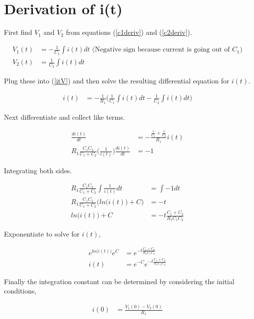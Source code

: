 \documentclass[12pt,letterpaper]{report}
\begin{document}
	\section{Derivation of i(t)}
	First find $V_1$ and $V_2$ from equations (\ref{c1deriv}) and (\ref{c2deriv}).  
	
	\begin{align}
		V_1(t) &= -\frac{1}{C_1} \int i(t) dt \text{ (Negative sign because current is going out of $C_1$)} \nonumber \\
		V_2(t) &= \frac{1}{C_2} \int i(t) dt
	\end{align}
	
	Plug these into (\ref{itV}) and then solve the resulting differential equation for $i(t)$.
	
	\begin{align}
		i(t) &= -\frac{1}{R_1} \bigg( \frac{1}{C_1} \int i(t) dt -\frac{1}{C_2} \int i(t) dt\bigg)
	\end{align}

	Next differentiate and collect like terms.
	
	\begin{align}
		\frac{di(t)}{dt} &= - \frac{\frac{1}{C_1} + \frac{1}{C_2}}{R_1} i(t) \nonumber \\
		R_1 \frac{C_1 C_2}{C_1 + C_2} \bigg ( \frac{1}{i(t)}\bigg) \frac{di(t)}{dt} &= -1
	\end{align}

	Integrating both sides.
	
	\begin{align}
		R_1 \frac{C_1 C_2}{C_1 + C_2} \int \frac{1}{i(t)} dt  &= \int -1 dt \\
		R_1 \frac{C_1 C_2}{C_1 + C_2} \bigg( ln\big(i(t)\big) + C\bigg) &= -t \\
		ln\big(i(t)\big) + C &= -t  \frac{C_1 + C_2}{R_1 C_1 C_2}
	\end{align}

	Exponentiate to solve for $i(t)$,
	
	\begin{align}
		e^{ln\big(i(t)\big)} e^{C} &= e^{-t \frac{C_1 + C_2}{ R_1C_1 C_2}} \nonumber \\
		i(t) &= e^{-C} e^{-t  \frac{C_1 + C_2}{ R_1C_1 C_2}} \label{it_general}
	\end{align}

	Finally the integration constant can be determined by considering the initial conditions,
	
	\begin{align}
		i(0) &= \frac{V_1(0) - V_2(0)}{R_1}
	\end{align}
\end{document}
